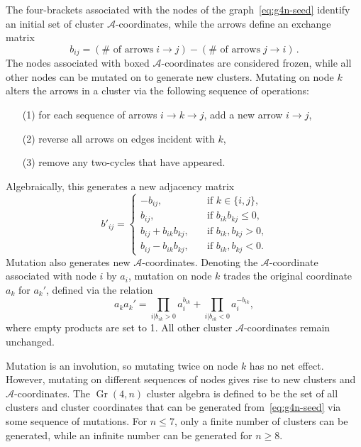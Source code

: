 \documentclass[11pt]{article}
\DeclareMathOperator{\Gr}{Gr}
\def\a{\mathcal{A}}
\begin{document}
The four-brackets associated with the nodes of the graph~\eqref{eq:g4n-seed} identify an initial set of cluster $\a$-coordinates, while the arrows define an exchange matrix 
\begin{equation}
b_{i j} = (\# \text{ of arrows}\; i \to j) - (\# \text{ of arrows}\; j \to i) \, .
\label{eq:bijdef}
\end{equation}
The nodes associated with boxed $\a$-coordinates are considered frozen, while all other nodes can be mutated on to generate new clusters. Mutating on node $k$ alters the arrows in a cluster via the following sequence of operations:
\begin{itemize}
	\item[(1)] for each sequence of arrows $i\to k \to j$, add a new arrow $i\to j$,
	\item[(2)] reverse all arrows on edges incident with $k$,
	\item[(3)] remove any two-cycles that have appeared.
\end{itemize}
Algebraically, this generates a new adjacency matrix 
\begin{equation}
  \label{eq:b-mutation}
  b'_{i j} =
  \begin{cases}
    -b_{i j}, &\quad \text{if $k \in \lbrace i, j\rbrace$,}\\
    b_{i j}, &\quad \text{if $b_{i k} b_{k j} \leq 0$,}\\
    b_{i j} + b_{i k} b_{k j}, &\quad \text{if $b_{i k}, b_{k j} > 0$,}\\
    b_{i j} - b_{i k} b_{k j}, &\quad \text{if $b_{i k}, b_{k j} < 0$.}
  \end{cases}
\end{equation}
Mutation also generates new $\a$-coordinates. Denoting the $\a$-coordinate associated with node $i$ by $a_i$, mutation on node $k$ trades the original coordinate $a_k$ for $a_k'$, defined via the relation
\begin{equation}
  \label{eq:a-coord-mutation}
  a_{k} a_{k}' = \prod_{i \vert b_{i k} > 0} a_{i}^{b_{i k}} + \prod_{i \vert b_{i k} < 0} a_{i}^{-b_{i k}},
\end{equation} 
where empty products are set to 1. All other cluster $\a$-coordinates remain unchanged. 

Mutation is an involution, so mutating twice on node $k$ has no net effect. However, mutating on different sequences  of nodes gives rise to new clusters and $\a$-coordinates. The $\Gr(4,n)$ cluster algebra is defined to be the set of all clusters and cluster coordinates that can be generated from~\eqref{eq:g4n-seed} via some sequence of mutations. For $n \le 7$, only a finite number of clusters can be generated, while an infinite number can be generated for $n\ge8$. 
\end{document}
